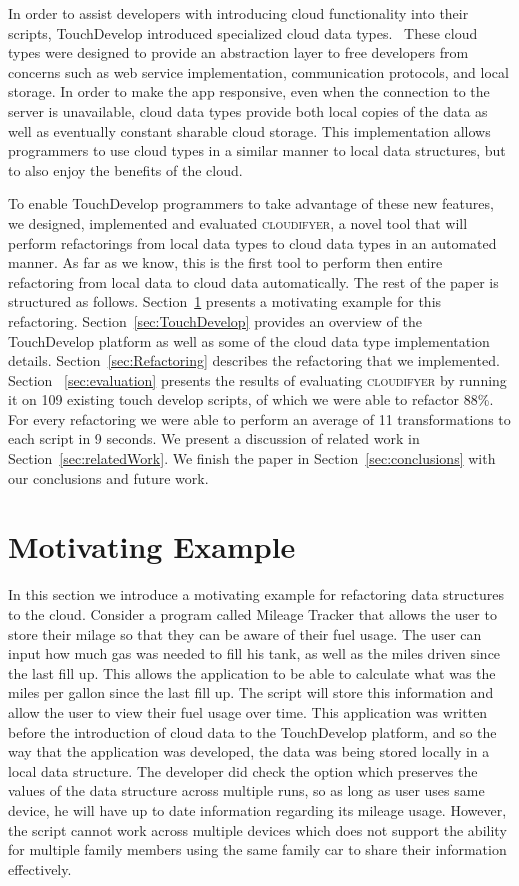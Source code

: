 \documentclass{sigplanconf}
\begin{document}
In order to assist developers with introducing cloud functionality into their scripts, TouchDevelop introduced specialized cloud data types.~\cite{burckhardt2012cloud}  These cloud types were designed to provide an abstraction layer to free developers from concerns such as web service implementation, communication protocols, and local storage.  In order to make the app responsive, even when the connection to the server is unavailable, cloud data types provide both local copies of the data as well as eventually constant sharable cloud storage.   This implementation allows programmers to use cloud types in a similar manner to local data structures, but to also enjoy the benefits of the cloud.

To enable TouchDevelop programmers to take advantage of these new features, we designed, implemented and evaluated  \textsc{cloudifyer}, a novel tool that will perform refactorings from local data types to cloud data types in an automated manner. As far as we know, this is the first tool to perform then entire refactoring from local data to cloud data automatically.
The rest of the paper is structured as follows.  Section~\ref{sec:motivatingExample} presents a motivating example for this refactoring.  Section~\ref{sec:TouchDevelop} provides an overview of the TouchDevelop platform as well as some of the cloud data type implementation details.  Section~\ref{sec:Refactoring} describes the refactoring that we implemented.  Section ~\ref{sec:evaluation} presents the results of evaluating \textsc{cloudifyer} by running it on 109 existing touch develop scripts, of which we were able to refactor 88\%.  For every refactoring we were able to perform an average of 11 transformations to each script in 9 seconds. We present a discussion of related work in Section~\ref{sec:relatedWork}.  We finish the paper in Section~\ref{sec:conclusions} with our conclusions and future work.


\section{Motivating Example}
\label{sec:motivatingExample}
In this section we introduce a motivating example for refactoring data structures to the cloud.   Consider a program called Mileage Tracker that allows the user to store their milage so that they can be aware of their fuel usage.  The user can input how much gas was needed to fill his tank, as well as the miles driven since the last fill up.  This allows the application to be able to calculate what was the miles per gallon since the last fill up.  The script will store this information and allow the user to view their fuel usage over time.  This application was written before the introduction of cloud data to the TouchDevelop platform, and so the way that the application was developed, the data was being stored locally in a local data structure.  The developer did check the option which preserves the values of the data structure across multiple runs, so as long as user uses same device, he will have up to date information regarding its mileage usage.  However, the script cannot work across multiple devices which does not support the ability for multiple family members using the same family car to share their information effectively.
\end{document}
